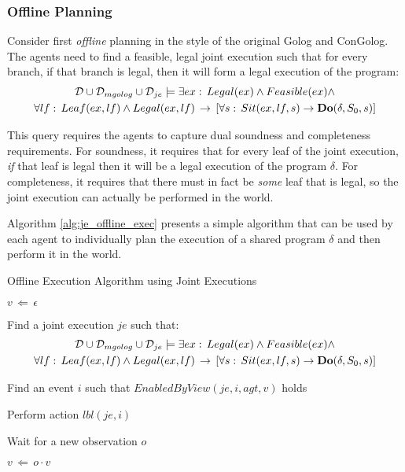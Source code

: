 \subsubsection{Offline Planning}

Consider first \emph{offline} planning in the style of the original
Golog and ConGolog. The agents need to find a feasible, legal joint
execution such that for every branch, if that branch is legal, then
it will form a legal execution of the program:\begin{multline*}
\mathcal{D}\cup\mathcal{D}_{mgolog}\cup\mathcal{D}_{je}\models\exists ex:\, Legal(ex)\wedge Feasible(ex)\wedge\\
\forall lf:\, Leaf(ex,lf)\wedge Legal(ex,lf)\,\rightarrow\,\left[\forall s:\, Sit(ex,lf,s)\rightarrow\mathbf{Do}(\delta,S_{0},s)\right]\end{multline*}


This query requires the agents to capture dual soundness and completeness
requirements. For soundness, it requires that for every leaf of the
joint execution, \emph{if} that leaf is legal then it will be a legal
execution of the program $\delta$. For completeness, it requires
that there must in fact be \emph{some} leaf that is legal, so the
joint execution can actually be performed in the world.

Algorithm \ref{alg:je_offline_exec} presents a simple algorithm that
can be used by each agent to individually plan the execution of a
shared program $\delta$ and then perform it in the world.

%
\begin{algorithm}[t]
 

\caption{Offline Execution Algorithm using Joint Executions}


\label{alg:je_offline_exec} \begin{algorithmic}

\STATE

\STATE $v\,\Leftarrow\,\epsilon$

\STATE Find a joint execution $je$ such that:\begin{multline*}
\mathcal{D}\cup\mathcal{D}_{mgolog}\cup\mathcal{D}_{je}\models\exists ex:\, Legal(ex)\wedge Feasible(ex)\wedge\\
\forall lf:\, Leaf(ex,lf)\wedge Legal(ex,lf)\,\rightarrow\,\left[\forall s:\, Sit(ex,lf,s)\rightarrow\mathbf{Do}(\delta,S_{0},s)\right]\end{multline*}



\STATE Find an event $i$ such that $EnabledByView(je,i,agt,v)$
holds


\STATE Perform action $lbl(je,i)$

\ENDIF

\STATE Wait for a new observation $o$

\STATE $v\,\Leftarrow\, o\cdot v$

\ENDWHILE

\end{algorithmic} 
\end{algorithm}



